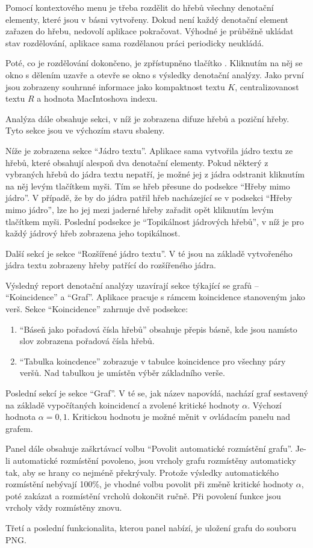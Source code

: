 \documentclass[dp.tex]{subfiles}
\begin{document}
Pomocí kontextového menu je třeba rozdělit do hřebů všechny denotační elementy, které jsou v básni vytvořeny. Dokud není každý denotační element zařazen do hřebu, nedovolí aplikace pokračovat. Výhodné je průběžně ukládat stav rozdělování, aplikace sama rozdělanou práci periodicky neukládá.

Poté, co je rozdělování dokončeno, je zpřístupněno tlačítko . Kliknutím na něj se okno s dělením uzavře a otevře se okno s výsledky denotační analýzy. Jako první jsou zobrazeny souhrnné informace jako kompaktnost textu $K$, centralizovanost textu $R$ a hodnota MacIntoshova indexu.

Analýza dále obsahuje sekci, v níž je zobrazena difuze hřebů a poziční hřeby. Tyto sekce jsou ve výchozím stavu sbaleny.

Níže je zobrazena sekce \enquote{Jádro textu}. Aplikace sama vytvořila jádro textu ze hřebů, které obsahují alespoň dva denotační elementy. Pokud některý z vybraných hřebů do jádra textu nepatří, je možné jej z jádra odstranit kliknutím na něj levým tlačítkem myši. Tím se hřeb přesune do podsekce \enquote{Hřeby mimo jádro}. V případě, že by do jádra patřil hřeb nacházející se v podsekci \enquote{Hřeby mimo jádro}, lze ho jej mezi jaderné hřeby zařadit opět kliknutím levým tlačítkem myši. Poslední podsekce je \enquote{Topikálnost jádrových hřebů}, v níž je pro každý jádrový hřeb zobrazena jeho topikálnost. 

Další sekcí je sekce \enquote{Rozšířené jádro textu}. V té jsou na základě vytvořeného jádra textu zobrazeny hřeby patřící do rozšířeného jádra.

Výsledný report denotační analýzy uzavírají sekce týkající se grafů -- \enquote{Koincidence} a \enquote{Graf}. Aplikace pracuje s rámcem koincidence stanoveným jako verš. Sekce \enquote{Koincidence} zahrnuje dvě podsekce:
\begin{enumerate}
\item \enquote{Báseň jako pořadová čísla hřebů} obsahuje přepis básně, kde jsou namísto slov zobrazena pořadová čísla hřebů. 
\item \enquote{Tabulka koincdence} zobrazuje v tabulce koincidence pro všechny páry veršů. Nad tabulkou je umístěn výběr základního verše.
\end{enumerate}

Poslední sekcí je sekce \enquote{Graf}. V té se, jak název napovídá, nachází graf sestavený na základě vypočítaných koincidencí a zvolené kritické hodnoty $\alpha$. Výchozí hodnota $\alpha = 0,1$. Kritickou hodnotu je možné měnit v ovládacím panelu nad grafem.

Panel dále obsahuje zaškrtávací volbu \enquote{Povolit automatické rozmístění grafu}. Je-li automatické rozmístění povoleno, jsou vrcholy grafu rozmístěny automaticky tak, aby se hrany co nejméně překrývaly. Protože výsledky automatického rozmístění nebývají 100\%, je vhodné volbu povolit při změně kritické hodnoty $\alpha$, poté zakázat a rozmístění vrcholů dokončit ručně. Při povolení funkce jsou vrcholy vždy rozmístěny znovu.

Třetí a poslední funkcionalita, kterou panel nabízí, je uložení grafu do souboru PNG.
\end{document}
